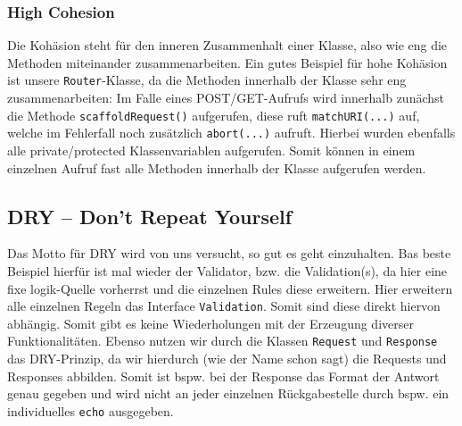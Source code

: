 \documentclass[12pt,a4paper,titlepage,ngerman,pdftex]{report}
\begin{document}
    \subsubsection{High Cohesion}
    Die Kohäsion steht für den inneren Zusammenhalt einer Klasse, also wie \glqq eng\grqq{} die Methoden miteinander zusammenarbeiten.
    Ein gutes Beispiel für hohe Kohäsion ist unsere \verb|Router|-Klasse, da die Methoden innerhalb der Klasse sehr eng zusammenarbeiten:
    Im Falle eines POST/GET-Aufrufs wird innerhalb zunächst die Methode \verb|scaffoldRequest()| aufgerufen, diese ruft \verb|matchURI(...)| auf, welche im Fehlerfall noch zusätzlich \verb|abort(...)| aufruft.
    Hierbei wurden ebenfalls alle private/protected Klassenvariablen aufgerufen.
    Somit können in einem einzelnen Aufruf fast alle Methoden innerhalb der Klasse aufgerufen werden.


    
    \subsection{DRY -- Don't Repeat Yourself}
    \label{subsec:dry}
    Das Motto für DRY wird von uns versucht, so gut es geht einzuhalten.
    Bas beste Beispiel hierfür ist mal wieder der Validator, bzw. die Validation(s), da hier eine fixe logik-Quelle vorherrst und die einzelnen Rules diese erweitern.
    Hier erweitern alle einzelnen Regeln das Interface \verb|Validation|.
    Somit sind diese direkt hiervon abhängig.
    Somit gibt es keine Wiederholungen mit der Erzeugung diverser Funktionalitäten.
    Ebenso nutzen wir durch die Klassen \verb|Request| und \verb|Response| das DRY-Prinzip, da wir hierdurch (wie der Name schon sagt) die Requests und Responses abbilden.
    Somit ist bspw. bei der Response das Format der Antwort genau gegeben und wird nicht an jeder einzelnen Rückgabestelle durch bspw. ein individuelles \verb|echo| ausgegeben.
\end{document}
